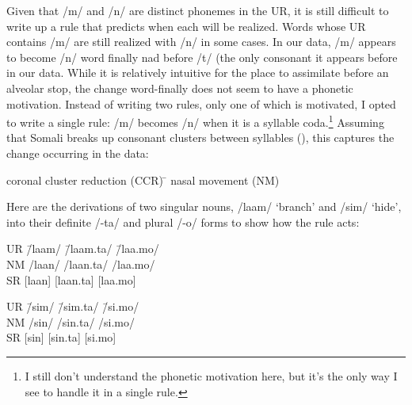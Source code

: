 \documentclass[doc,12pt]{apa6}
\begin{document}
Given that /m/ and /n/ are distinct phonemes in the UR, it is still difficult
to write up a rule that predicts when each will be realized. Words whose UR
contains /m/ are still realized with /n/ in some cases.  In our data, /m/
appears to become /n/ word finally nad before /t/ (the only consonant it
appears before in our data. While it is relatively intuitive for the place to
assimilate before an alveolar stop, the change word-finally does not seem to
have a phonetic motivation. Instead of writing two rules, only one of which is
motivated, I opted to write a single rule: /m/ becomes /n/ when it is a
syllable coda.\footnote{I still don't understand the phonetic motivation here,
but it's the only way I see to handle it in a single rule.} Assuming that
Somali breaks up consonant clusters between syllables (), this
captures the change occurring in the data:

\begin{exe}
	\ex \begin{tabbing}
		coronal cluster reduction (CCR) \= \kill
		nasal movement (NM) \>
		\phonr{\phonfeat{+nas\\-syl}}{
		       \phonfeat{-lab\\+cor}}{
		       {]}_\sigma}
		\end{tabbing}
\end{exe}

Here are the derivations of two singular nouns, /laam/ `branch' and /sim/
`hide', into their definite /-ta/ and plural /-o/ forms to show how the rule
acts:

\begin{exe}
	\ex \begin{tabbing}
		UR \hspace{2em} \= /laam/ \= /laam.ta/ \= /laa.mo/ \\
		NM \> /laan/ \> /laan.ta/ \> /laa.mo/ \\
		SR \> {[}laan{]} \> {[}laan.ta{]} \> {[}laa.mo{]}
		\end{tabbing}
	\ex \begin{tabbing}
		UR \hspace{2em} \= /sim/ \= /sim.ta/ \= /si.mo/ \\
		NM \> /sin/ \> /sin.ta/ \> /si.mo/ \\
		SR \> {[}sin{]} \> {[}sin.ta{]} \> {[}si.mo{]}
		\end{tabbing}
\end{exe}
\end{document}
